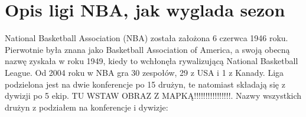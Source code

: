 \documentclass[inzynierska]{pwr_wmat_praca_dyplomowa}
\theoremstyle{plain}
\numberwithin{theorem}{chapter}
\theoremstyle{definition}
\numberwithin{theorem}{chapter}
\begin{document}
\chapter{Opis ligi NBA, jak wyglada sezon}
National Basketball Association (NBA) została założona 6 czerwca 1946 roku. Pierwotnie była znana jako Basketball Association of America, a swoją obecną nazwę zyskała w roku 1949, kiedy to wchłonęła rywalizującą National Basketball League. Od 2004 roku w NBA gra 30 zespołów, 29 z USA i 1 z Kanady. Liga podzielona jest na dwie konferencje po 15 drużyn, te natomiast składają się z dywizji po 5 ekip. TU WSTAW OBRAZ Z MAPKĄ!!!!!!!!!!!!!!!!. Nazwy wszystkich drużyn z podziałem na konferencje i dywizje:
\end{document}

